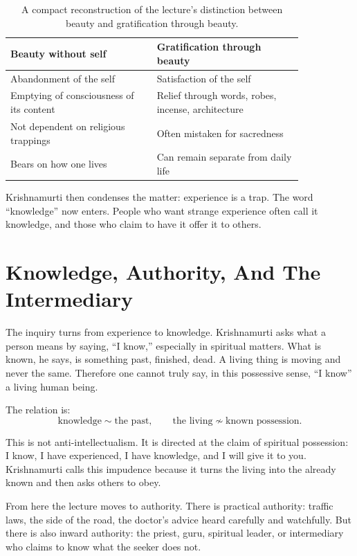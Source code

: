 \begin{table}
\centering
\begin{tabular}{p{0.42\linewidth} p{0.42\linewidth}}
\hline
Beauty without self & Gratification through beauty \\
\hline
Abandonment of the self & Satisfaction of the self \\
Emptying of consciousness of its content & Relief through words, robes, incense, architecture \\
Not dependent on religious trappings & Often mistaken for sacredness \\
Bears on how one lives & Can remain separate from daily life \\
\hline
\end{tabular}
\caption{A compact reconstruction of the lecture's distinction between beauty and gratification through beauty.}
\end{table}

Krishnamurti then condenses the matter: experience is a trap. The word ``knowledge'' now enters. People who want strange experience often call it knowledge, and those who claim to have it offer it to others.

\section{Knowledge, Authority, And The Intermediary}

The inquiry turns from experience to knowledge. Krishnamurti asks what a person means by saying, ``I know,'' especially in spiritual matters. What is known, he says, is something past, finished, dead. A living thing is moving and never the same. Therefore one cannot truly say, in this possessive sense, ``I know'' a living human being.

The relation is:
\begin{equation}
\text{knowledge}
\sim
\text{the past},
\qquad
\text{the living}
\not\sim
\text{known possession}.
\end{equation}

This is not anti-intellectualism. It is directed at the claim of spiritual possession: I know, I have experienced, I have knowledge, and I will give it to you. Krishnamurti calls this impudence because it turns the living into the already known and then asks others to obey.

From here the lecture moves to authority. There is practical authority: traffic laws, the side of the road, the doctor's advice heard carefully and watchfully. But there is also inward authority: the priest, guru, spiritual leader, or intermediary who claims to know what the seeker does not.

